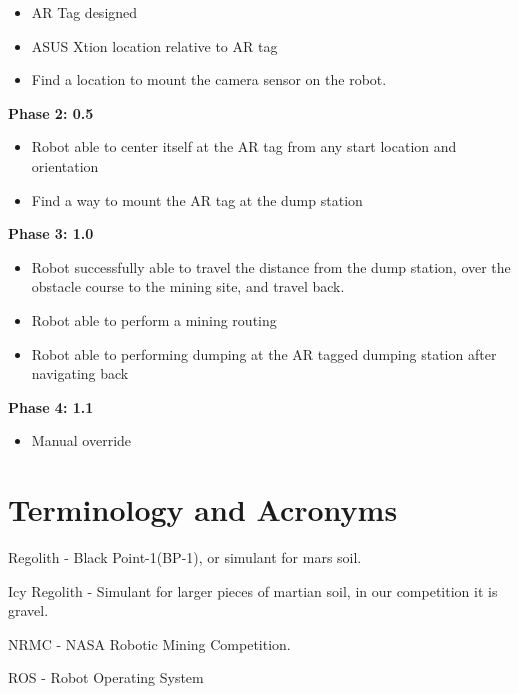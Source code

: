 	\begin{itemize}
	\item AR Tag designed
	\item ASUS Xtion location relative to AR tag
	\item Find a location to mount the camera sensor on the robot.
	\end{itemize}


	\vspace{\baselineskip}
	\vspace{\baselineskip}
	\vspace{\baselineskip}
	
	\newpage
	\textbf{Phase 2: 0.5}

	\begin{itemize}
	\item Robot able to center itself at the AR tag from any start location and orientation
	\item Find a way to mount the AR tag at the dump station
	\end{itemize}
	

	\vspace{\baselineskip}
	\textbf{Phase 3: 1.0}

	\begin{itemize}
	\item Robot successfully able to travel the distance from the dump station, over the obstacle course to the mining site, and travel back.
	\item Robot able to perform a mining routing
	\item Robot able to performing dumping at the AR tagged dumping station after navigating back
	\end{itemize}
	
	\vspace{\baselineskip}
	\textbf{Phase 4: 1.1}
	
	\begin{itemize}
	\item Manual override

	
	\end{itemize}
	\vspace{\baselineskip}


\section{Terminology and Acronyms}
\hspace{ 5mm}Regolith - Black Point-1(BP-1), or simulant for mars soil.

Icy Regolith - Simulant for larger pieces of martian soil, in our competition it is gravel.


NRMC - NASA Robotic Mining Competition.


ROS - Robot Operating System
